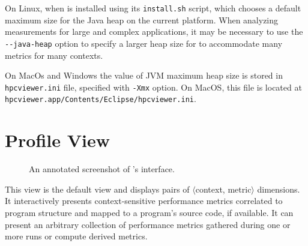 On Linux, when  \hpcviewer{}  is installed using its \verb|install.sh| script, which chooses a default maximum size for the Java heap on the current platform. When analyzing measurements for large and complex applications, it may be necessary to use the \verb|--java-heap| option to specify a larger heap size for  \hpcviewer{}  to accommodate many metrics for many contexts.

On MacOs and Windows the value of JVM maximum heap size is stored in \texttt{hpcviewer.ini} file, specified with \texttt{-Xmx} option.
On MacOS, this file is located at \texttt{hpcviewer.app/Contents/Eclipse/hpcviewer.ini}.


\section{Profile View}
\label{sec:profile}

\begin{figure}[t]
\caption{An annotated screenshot of \hpcviewer{}'s interface.}
\label{fig:hpcviewer-legend}
\end{figure}

This view is the default view and displays pairs of $\langle$context, metric$\rangle$ dimensions.
It interactively presents context-sensitive performance metrics correlated to program structure and mapped to a program's source code, if available.
It can present an arbitrary collection of performance metrics gathered during one or more runs or compute derived metrics.

